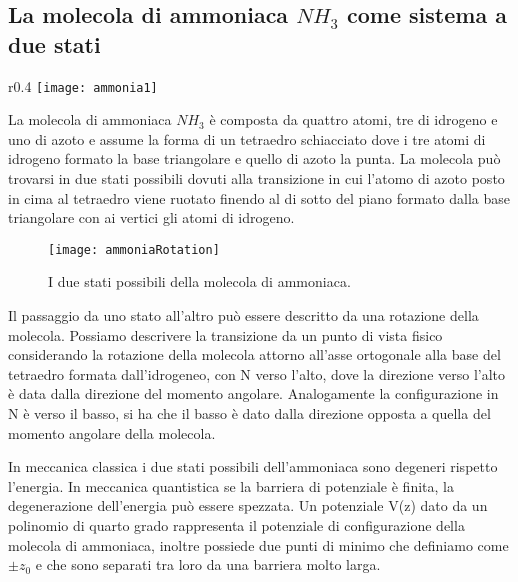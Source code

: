 \subsection{La molecola di ammoniaca $NH_3$ come sistema a due stati}
\begin{wrapfigure}{r}{0.4\textwidth} %
    \centering
    \texttt{[image: ammonia1]} %
\end{wrapfigure}
La molecola di ammoniaca $NH_3$ \`e composta da quattro atomi, tre di idrogeno e uno di azoto e assume la forma di un tetraedro schiacciato dove i tre atomi di idrogeno formato la base triangolare e quello di azoto la punta. La molecola pu\`o trovarsi in due stati possibili dovuti alla transizione in cui l'atomo di azoto posto in cima al tetraedro viene ruotato finendo al di sotto del piano formato dalla base triangolare con ai vertici gli atomi di idrogeno. 
\begin{figure}[!ht]
\vspace{0.1in}
\texttt{[image: ammoniaRotation]}	
\centering
\vspace{0.1in}
\caption{I due stati possibili della molecola di ammoniaca.}
\end{figure}
\newpage

Il passaggio da uno stato all'altro pu\`o essere descritto da una rotazione della molecola. Possiamo descrivere la transizione da un punto di vista fisico considerando la rotazione della molecola attorno all'asse ortogonale alla base del tetraedro formata dall'idrogeneo, con N verso l'alto, dove la direzione verso l'alto \`e data dalla direzione del momento angolare. Analogamente la configurazione in N \`e verso il basso, si ha che il basso \`e dato dalla direzione opposta a quella del momento angolare della molecola.

In meccanica classica i due stati possibili dell'ammoniaca sono degeneri rispetto l'energia. In meccanica quantistica se la barriera di potenziale \`e finita, la degenerazione dell'energia pu\`o essere spezzata. Un potenziale V(z) dato da un polinomio di quarto grado rappresenta il potenziale di configurazione della molecola di ammoniaca, inoltre possiede due punti di minimo che definiamo come $\pm z_0$ e che sono separati tra loro da una barriera molto larga.

